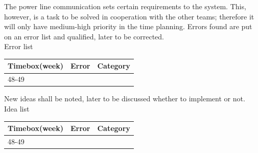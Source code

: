 \documentclass[12pt,a4paper]{report}
\begin{document}
The power line communication sets certain requirements to the system. This, however, is a task to be solved in cooperation with the other teams; therefore it will only have medium-high priority in the time planning.
Errors found are put on an error list and qualified, later to be corrected.\\

Error list
\begin{tabular}{|l|l|l|}
\hline Timebox(week) & Error & Category \\ 
\hline 48-49 &  &  \\ 
\hline 
\end{tabular} 	

New ideas shall be noted, later to be discussed whether to implement or not.\\

Idea list

\begin{tabular}{|l|l|l|}
\hline Timebox(week) & Error & Category \\ 
\hline 48-49 &  &  \\ 
\hline 
\end{tabular} 
\end{document}
